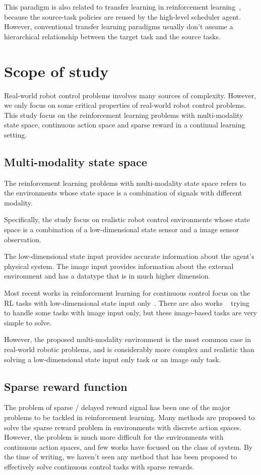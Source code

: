 This paradigm is also related to transfer learning in reinforcement learning~\cite{taylor2009transfer}, because the source-task policies are reused by the high-level scheduler agent. However, conventional transfer learning paradigms usually don't assume a hierarchical relationship between the target task and the source tasks.



\section{Scope of study}
Real-world robot control problems involves many sources of complexity. However, we only focus on some critical properties of real-world robot control problems.
This study focus on the reinforcement learning problems with multi-modality state space, continuous action space and sparse reward in a continual learning setting.

\subsection{Multi-modality state space}

The reinforcement learning problems with multi-modality state space refers to the environments whose state space is a combination of signals with different modality.

Specifically, the study focus on realistic robot control environments whose state space is a combination of a low-dimensional state sensor and a image sensor observation.

The low-dimensional state input provides accurate information about the agent's physical system. The image input provides information about the external environment and has a datatype that is in much higher dimension.

Most recent works in reinforcement learning for continuous control focus on the RL tasks with low-dimensional state input only~\cite{duan2016benchmarking}. There are also works ~\cite{wu2017scalable} trying to handle some tasks with image input only, but these image-based tasks are very simple to solve.

However, the proposed multi-modality environment is the most common case in real-world robotic problems, and is considerably more complex and realistic than solving a low-dimensional state input only task or an image only task.


\subsection{Sparse reward function}
The problem of sparse / delayed reward signal has been one of the major problems to be tackled in reinforcement learning. Many methods are proposed to solve the sparse reward problem in environments with discrete action spaces. However, the problem is much more difficult for the environments with continuous action spaces, and few works have focused on the class of system. By the time of writing, we haven't seen any method that has been proposed to effectively solve continuous control tasks with sparse rewards.

